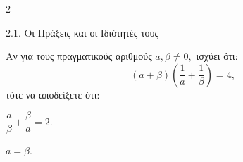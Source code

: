 \begin{ylh}{2}
    \item 2.1. Οι Πράξεις και οι Ιδιότητές τους
\end{ylh}
Αν για τους πραγματικούς αριθμούς $a,\beta \neq 0,$ ισχύει ότι:
\[(a + \beta)\left( \dfrac{1}{a} + \dfrac{1}{\beta} \right) = 4,\] τότε να αποδείξετε ότι:
\begin{alist}
\item $\dfrac{a}{\beta} + \dfrac{\beta}{a} = 2.$
\item $a = \beta.$
\end{alist}

